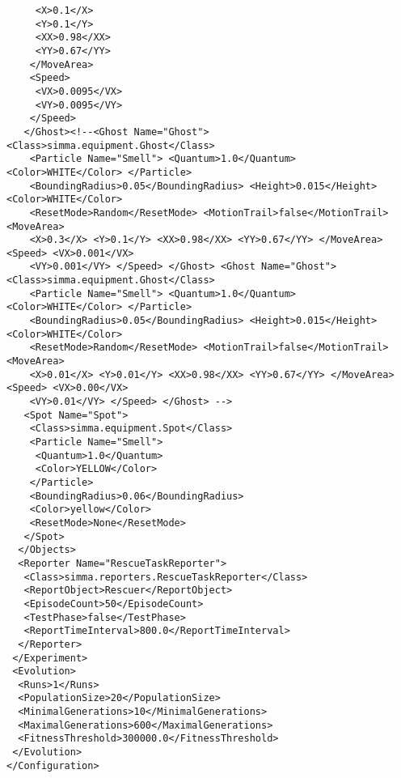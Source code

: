 \documentclass[12pt,fleqn,a4paper]{article}
\begin{document}
\begin{lstlisting}
     <X>0.1</X>
     <Y>0.1</Y>
     <XX>0.98</XX>
     <YY>0.67</YY>
    </MoveArea>
    <Speed>
     <VX>0.0095</VX>
     <VY>0.0095</VY>
    </Speed>
   </Ghost><!--<Ghost Name="Ghost"> <Class>simma.equipment.Ghost</Class> 
    <Particle Name="Smell"> <Quantum>1.0</Quantum> <Color>WHITE</Color> </Particle> 
    <BoundingRadius>0.05</BoundingRadius> <Height>0.015</Height> <Color>WHITE</Color> 
    <ResetMode>Random</ResetMode> <MotionTrail>false</MotionTrail> <MoveArea> 
    <X>0.3</X> <Y>0.1</Y> <XX>0.98</XX> <YY>0.67</YY> </MoveArea> <Speed> <VX>0.001</VX> 
    <VY>0.001</VY> </Speed> </Ghost> <Ghost Name="Ghost"> <Class>simma.equipment.Ghost</Class> 
    <Particle Name="Smell"> <Quantum>1.0</Quantum> <Color>WHITE</Color> </Particle> 
    <BoundingRadius>0.05</BoundingRadius> <Height>0.015</Height> <Color>WHITE</Color> 
    <ResetMode>Random</ResetMode> <MotionTrail>false</MotionTrail> <MoveArea> 
    <X>0.01</X> <Y>0.01</Y> <XX>0.98</XX> <YY>0.67</YY> </MoveArea> <Speed> <VX>0.00</VX> 
    <VY>0.01</VY> </Speed> </Ghost> -->
   <Spot Name="Spot">
    <Class>simma.equipment.Spot</Class>
    <Particle Name="Smell">
     <Quantum>1.0</Quantum>
     <Color>YELLOW</Color>
    </Particle>
    <BoundingRadius>0.06</BoundingRadius>
    <Color>yellow</Color>
    <ResetMode>None</ResetMode>
   </Spot>
  </Objects>
  <Reporter Name="RescueTaskReporter">
   <Class>simma.reporters.RescueTaskReporter</Class>
   <ReportObject>Rescuer</ReportObject>
   <EpisodeCount>50</EpisodeCount>
   <TestPhase>false</TestPhase>
   <ReportTimeInterval>800.0</ReportTimeInterval>
  </Reporter>
 </Experiment>
 <Evolution>
  <Runs>1</Runs>
  <PopulationSize>20</PopulationSize>
  <MinimalGenerations>10</MinimalGenerations>
  <MaximalGenerations>600</MaximalGenerations>
  <FitnessThreshold>300000.0</FitnessThreshold>
 </Evolution>
</Configuration>
\end{lstlisting}

%
%
\end{document}
